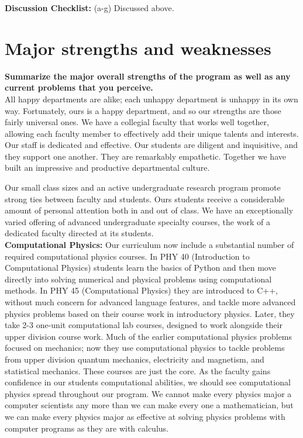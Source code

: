 \documentclass[12pt]{article}
\begin{document}
\noindent
{\bf Discussion Checklist:} (a-g) Discussed above.

\newpage
\section{Major strengths and weaknesses}
\label{sec:snws}

{\bf Summarize the major overall strengths of the program as well as
  any current problems that you perceive.}\\[3pt]

\noindent
All happy departments are alike; each unhappy department is unhappy in
its own way.  Fortunately, ours is a happy department, and so our
strengths are those fairly universal ones.  We have a collegial
faculty that works well together, allowing each faculty member to
effectively add their unique talents and interests.  Our staff is
dedicated and effective.  Our students are diligent and inquisitive,
and they support one another.  They are remarkably empathetic.
Together we have built an impressive and productive departmental
culture.

Our small class sizes and an active undergraduate research program
promote strong ties between faculty and students.  Ours students
receive a considerable amount of personal attention both in and out of
class.  We have an exceptionally varied offering of advanced
undergraduate specialty courses, the work of a dedicated faculty
directed at its students.\\[3pt]

\noindent
{\bf Computational Physics:} Our curriculum now include a substantial
number of required computational physics courses.  In PHY 40
(Introduction to Computational Physics) students learn the basics of
Python and then move directly into solving numerical and physical
problems using computational methods.  In PHY 45 (Computational
Physics) they are introduced to C++, without much concern for advanced
language features, and tackle more advanced physics problems based on
their course work in introductory physics.  Later, they take 2-3
one-unit computational lab courses, designed to work alongside their
upper division course work.  Much of the earlier computational physics
problems focused on mechanics; now they use computational physics to
tackle problems from upper division quantum mechanics, electricity and
magnetism, and statistical mechanics. These courses are just the core.
As the faculty gains confidence in our students computational
abilities, we should see computational physics spread throughout our
program.  We cannot make every physics major a computer scientists any
more than we can make every one a mathematician, but we can make every
physics major as effective at solving physics problems with computer
programs as they are with calculus.\\[3pt]
\end{document}

